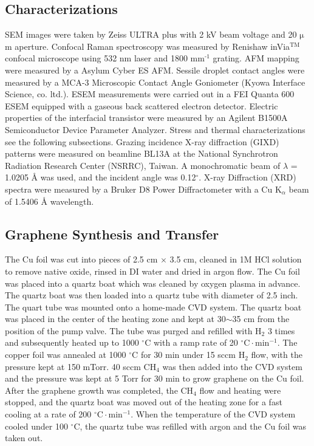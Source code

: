 \subsection*{Characterizations}
\label{sec:small-org048d24a}
SEM images were taken by Zeiss ULTRA plus with 2 kV beam voltage
and 20 \(\mathrm{\mu}\)m aperture. Confocal Raman spectroscopy was
measured by Renishaw inVia\(^{\textrm{TM}}\) confocal microscope using
532 nm laser and 1800 mm\(^{\text{-1}}\) grating. AFM mapping were measured by
a Asylum Cyber ES AFM. Sessile droplet contact angles were measured
by a MCA-3 Microscopic Contact Angle Goniometer (Kyowa Interface
Science, co. ltd.). ESEM measurements were carried out in a FEI
Quanta 600 ESEM equipped with a gaseous back scattered electron
detector. Electric properties of the interfacial transistor were
measured by an Agilent B1500A Semiconductor Device Parameter
Analyzer. Stress and thermal characterizations see the following
subsections. Grazing incidence X-ray diffraction (GIXD) patterns
were measured on beamline BL13A at the National Synchrotron
Radiation Research Center (NSRRC), Taiwan. A monochromatic beam of
\(\lambda\) = 1.0205 \AA{} was used, and the incident angle was
0.12\(^{\circ}\). X-ray Diffraction (XRD) spectra were measured by
a Bruker D8 Power Diffractometer with a Cu K\(_{\alpha}\) beam of
1.5406 \AA{} wavelength.

\subsection*{Graphene Synthesis and Transfer}
\label{sec:small-org7dad228}

The Cu foil was cut into pieces of 2.5 cm \(\times\) 3.5 cm, cleaned in 1M
HCl solution to remove native oxide, rinsed in DI water and dried in
argon flow. The Cu foil was placed into a quartz boat which was
cleaned by oxygen plasma in advance. The quartz boat was then loaded
into a quartz tube with diameter of 2.5 inch. The quart tube was
mounted onto a home-made CVD system. The quartz boat was placed in the
center of the heating zone and kept at 30\(\sim\)35 cm from the position of
the pump valve. The tube was purged and refilled with H\(_{\text{2}}\) 3 times
and subsequently heated up to 1000 \(^\circ \mathrm{C}\) with a ramp
rate of 20 \(^{\circ}\mathrm{C} \cdot \mathrm{min}^{-1}\). The copper
foil was annealed at 1000 \(^\circ \mathrm{C}\) for 30 min under 15 sccm
H\(_{\text{2}}\) flow, with the pressure kept at 150 mTorr. 40 sccm CH\(_{\text{4}}\) was
then added into the CVD system and the pressure was kept at 5 Torr for
30 min to grow graphene on the Cu foil. After the graphene growth
was completed, the CH\(_{\text{4}}\) flow and heating were stopped, and the quartz
boat was moved out of the heating zone for a fast cooling at a rate of
200 \(^{\circ}\mathrm{C} \cdot \mathrm{min}^{-1}\). When the temperature
of the CVD system cooled under 100 \(^{\circ}\mathrm{C}\), the quartz tube
was refilled with argon and the Cu foil was taken out.

